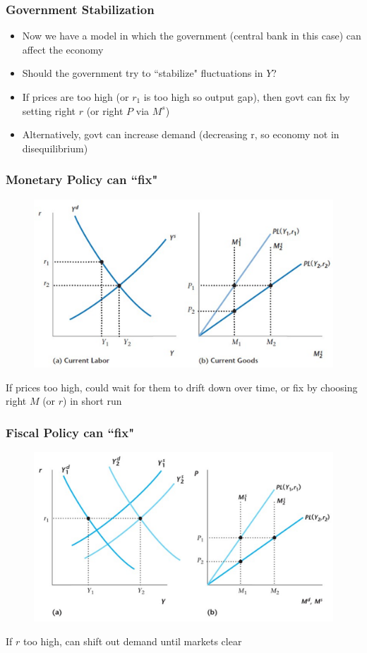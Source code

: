 \documentclass{beamer}
\begin{document}
\begin{frame}
\frametitle[alignment=center]{Government Stabilization}
\begin{itemize}
\item Now we have a model in which the government (central bank in this case) can affect the economy
\bigskip
\item Should the government try to ``stabilize" fluctuations in $Y$?
\bigskip
\item If prices are too high (or $r_1$ is too high so output gap), then govt can fix by setting right $r$ (or right $P$ via $M^s$)
\bigskip
\item Alternatively, govt can increase demand (decreasing r, so economy not in disequilibrium)
\end{itemize}
\end{frame}

\begin{frame}
\frametitle[alignment=center]{Monetary Policy can ``fix" }
\begin{figure}
\centering
\includegraphics[scale=0.65]{Figures/W_Fig_14pt3.png}
\end{figure}
If prices too high, could wait for them to drift down over time, or fix by choosing right $M$ (or $r$) in short run
\end{frame}


\begin{frame}
\frametitle[alignment=center]{Fiscal Policy can ``fix" }
\begin{figure}
\centering
\includegraphics[scale=0.65]{Figures/W_Fig_14pt4.png}
\end{figure}
If $r$ too high, can shift out demand until markets clear
\end{frame}
\end{document}
